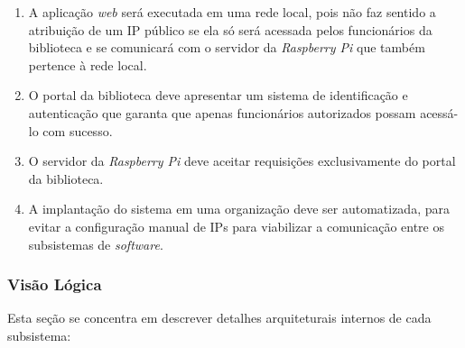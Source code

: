 \begin{enumerate}
    \item A aplicação \textit{web} será executada em uma rede local, pois não faz sentido a atribuição de um IP público se ela só será acessada pelos funcionários da biblioteca e se comunicará com o servidor da \textit{Raspberry Pi} que também pertence à rede local.

    \item O portal da biblioteca deve apresentar um sistema de identificação e autenticação que garanta que apenas funcionários autorizados possam acessá-lo com sucesso.

    \item O servidor da \textit{Raspberry Pi} deve aceitar requisições exclusivamente do portal da biblioteca.

    \item A implantação do sistema em uma organização deve ser automatizada, para evitar a configuração manual de IPs para viabilizar a comunicação entre os subsistemas de \textit{software}.
\end{enumerate}

\subsubsection{Visão Lógica}
Esta seção se concentra em descrever detalhes arquiteturais internos de cada subsistema:

